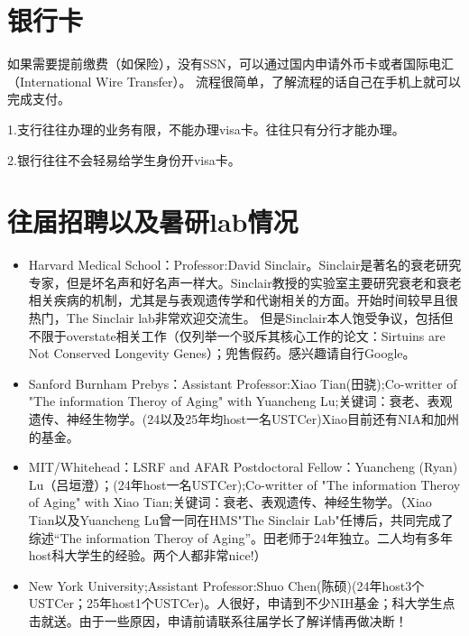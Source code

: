 \section*{银行卡}

如果需要提前缴费（如保险），没有SSN，可以通过国内申请外币卡或者国际电汇（International Wire Transfer）。
流程很简单，了解流程的话自己在手机上就可以完成支付。

1.支行往往办理的业务有限，不能办理visa卡。往往只有分行才能办理。

2.银行往往不会轻易给学生身份开visa卡。


\section{往届招聘以及暑研lab情况}


\begin{presentbox}[2026fall]

\begin{itemize}
    \item Harvard Medical School：Professor:David Sinclair。Sinclair是著名的衰老研究专家，但是坏名声和好名声一样大。Sinclair教授的实验室主要研究衰老和衰老相关疾病的机制，尤其是与表观遗传学和代谢相关的方面。开始时间较早且很热门，The Sinclair lab非常欢迎交流生。
    但是Sinclair本人饱受争议，包括但不限于overstate相关工作（仅列举一个驳斥其核心工作的论文：Sirtuins are Not Conserved Longevity Genes）；兜售假药。感兴趣请自行Google。
    \item Sanford Burnham Prebys：Assistant Professor:Xiao Tian(田骁);Co-writter of "The information Theroy of Aging" with Yuancheng Lu;关键词：衰老、表观遗传、神经生物学。(24以及25年均host一名USTCer)Xiao目前还有NIA和加州的基金。
    \item MIT/Whitehead：LSRF and AFAR Postdoctoral Fellow：Yuancheng (Ryan) Lu（吕垣澄）；(24年host一名USTCer);Co-writter of "The information Theroy of Aging" with Xiao Tian;关键词：衰老、表观遗传、神经生物学。（Xiao Tian以及Yuancheng Lu曾一同在HMS"The Sinclair Lab"任博后，共同完成了综述“The information Theroy of Aging”。田老师于24年独立。二人均有多年host科大学生的经验。两个人都非常nice!）
    \item New York University;Assistant Professor:Shuo Chen(陈硕)(24年host3个USTCer；25年host1个USTCer)。人很好，申请到不少NIH基金；科大学生点击就送。由于一些原因，申请前请联系往届学长了解详情再做决断！
\end{itemize}    

\end{presentbox}

